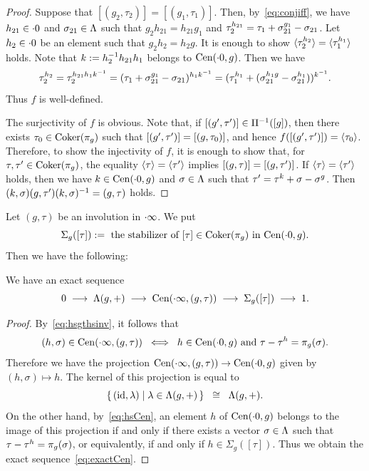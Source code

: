 \documentclass{amsart} %
\begin{document}
%
\begin{proof}
Suppose that $[(g_2, \tau_2)]=[(g_1, \tau_1)] $.
Then, by~\eqref{eq:conjiff}, we have $h_{21}\in \cdot 0$ and $\sigma_{21}\in \Lambda$ 
such that $g_2 h_{21}=h_{21} g_1$
and $\tau_2\sp{h_{21}}=\tau_1 +\sigma_{21}\sp{g_1}-\sigma_{21}$.
Let $h_2\in \cdot 0 $ be an element 
such that $g_2 h_2=h_2 g $.
It is enough to show 
$\langle {\tau_2^{ h_2}} \rangle=\langle {\tau_1^{h_1}} \rangle$ holds.
Note that $k:=h_2^{-1} h_{21} h_1$ belongs to $\mathrm{Cen}(\cdot 0, g)$.
Then we have 
\[
\tau_2^{ h_2}=\tau_2^{ h_{21} h_1 k^{-1}}
=(\tau_1 +\sigma_{21}\sp{g_1}-\sigma_{21})^{ h_1 k^{-1}}
=(\tau_1\sp{ h_1}+(\sigma_{21}\sp{h_1 g}-\sigma_{21}\sp{h_1}))^{k^{-1}}.
\]
Thus $f$ is well-defined.
\par
The surjectivity of $f$ is obvious.
Note that, if $[(g^{\prime}, \tau^{\prime})]\in \Pi^{-1}([g])$,
then there exists $\tau_0\in \operatorname{Coker}(\pi_{g})$ such that 
$[(g^{\prime}, \tau^{\prime})]=[(g, \tau_0)]$, 
and hence
$f([(g^{\prime}, \tau^{\prime})])=\langle {\tau_0} \rangle$.
Therefore, to show the injectivity of $f$,
it is enough to show that, 
for $\tau, \tau^{\prime}\in \operatorname{Coker}(\pi_{g})$,
the equality $\langle {\tau} \rangle=\langle {\tau^{\prime}} \rangle$ implies 
$[(g, \tau)]=[(g, \tau^{\prime})]$.
If $\langle {\tau} \rangle=\langle {\tau^{\prime}} \rangle$ holds,
then we have $k\in \mathrm{Cen}(\cdot 0, g)$ and $\sigma\in \Lambda$
such that $\tau^{\prime}=\tau^k+\sigma-\sigma^g$.
Then $(k, \sigma)(g, \tau^{\prime})(k, \sigma)^{-1}=(g, \tau)$ holds.
%
\end{proof}
%
%
%
Let $(g, \tau)$ be an involution in $\cdot \infty$.
We put
\[
\Sigma_g([\tau]) :=
\textrm{ the stabilizer of $[\tau]\in \operatorname{Coker}(\pi_{g})$ in $\mathrm{Cen}(\cdot 0, g)$}.
\]
Then we have the following:
%
\begin{proposition}\label{prop:exactCen}
We have an exact sequence 
%
\begin{equation}\label{eq:exactCen}
0 \;\longrightarrow\; \Lambda(g, +)\;\longrightarrow\; \mathrm{Cen}(\cdot \infty, (g, \tau)) 
\;\longrightarrow\;\Sigma_g([\tau]) \;\longrightarrow\; 1.
\end{equation}
%
\end{proposition}
%
\begin{proof}
By~\eqref{eq:hsgthsinv}, it follows that 
%
\begin{equation}\label{eq:hsCen}
(h, \sigma)\in \mathrm{Cen}(\cdot \infty, (g, \tau))
\;\; \Longleftrightarrow\;\; 
\textrm{$h\in \mathrm{Cen}(\cdot 0, g)$ and $\tau-\tau^h=\pi_{g}(\sigma)$}.
\end{equation}
%
Therefore we have the projection 
$\mathrm{Cen}(\cdot \infty, (g, \tau))\to \mathrm{Cen}(\cdot 0, g)$
given by $(h, \sigma)\mapsto h$.
The kernel of this projection is equal to 
\[
\{\,{(\mathord{\mathrm{id}}, \lambda)}\mid {\lambda\in \Lambda(g, +)} \,\}\;\;\cong\;\; \Lambda(g, +).
\]
On the other hand, by~\eqref{eq:hsCen}, 
an element $h$ of $\mathrm{Cen}(\cdot 0, g)$
belongs to the image of this projection if and only if 
there exists a vector $\sigma\in \Lambda$ such that 
$\tau-\tau^h=\pi_{g}(\sigma)$, or equivalently, if and only if 
$h\in \Sigma_g([\tau]) $.
Thus we obtain the exact sequence~\eqref{eq:exactCen}.
\end{proof}
%
%
\end{document}
